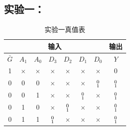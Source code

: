 \documentclass[a4paper,11pt,UTF8]{ctexart}
\begin{document}
 \subsection{实验一：\expa}
 \begin{table}[H]
  \centering
  \begin{tabular}{|ccccccc|c|}\hline
   \multicolumn{7}{|c|}{输入}  &输出
   \\\hline
   $\bar{G}$ &$A_1$ &$A_0$ &$D_3$ &$D_2$ &
   $D_1$ &$D_0$  &$Y$
   \\\hline
   1 &$\times$ &$\times$ &$\times$	&$\times$ &$\times$ &$\times$ &0	\\
   0 &0 &0 &$\times$	&$\times$ &$\times$ &$\smqty{0\\1}$ &$\smqty{0\\1}$	\\
   0 &0 &1 &$\times$	&$\times$ &$\smqty{0\\1}$ &$\times$ &$\smqty{0\\1}$	\\
   0 &1 &0 &$\times$	&$\smqty{0\\1}$ &$\times$ &$\times$ &$\smqty{0\\1}$	\\
   0 &1 &1 &$\smqty{0\\1}$	&$\times$ &$\times$ &$\times$ &$\smqty{0\\1}$	
   \\\hline
  \end{tabular}
  \caption{实验一真值表}
  \label{tab:Exp01}
 \end{table}
\end{document}
